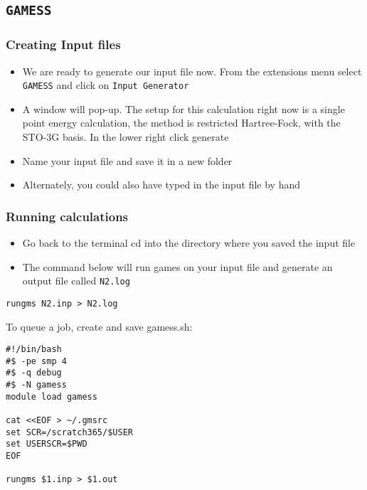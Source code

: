 \documentclass[11pt]{article}
\begin{document}
\subsection{\texttt{GAMESS}}
\label{sec:org825bc2f}

\subsubsection{Creating Input files}
\label{sec:org5f29a80}

\begin{itemize}
\item We are ready to generate our input file now. From the extensions menu select \texttt{GAMESS} and click on \texttt{Input Generator}

\item A window will pop-up. The setup for this calculation right now is a single point energy calculation, the method is restricted Hartree-Fock, with the STO-3G basis. In the lower right click generate

\item Name your input file and save it in a new folder

\item Alternately, you could also have typed in the input file by hand
\end{itemize}

\subsubsection{Running calculations}
\label{sec:org0e8dd48}

\begin{itemize}
\item Go back to the terminal cd into the directory where you saved the input file

\item The command below will run games on your input file and generate an output file called \texttt{N2.log}
\end{itemize}

\begin{verbatim}
rungms N2.inp > N2.log
\end{verbatim}

To queue a job, create and save gamess.sh:
\begin{verbatim}
#!/bin/bash
#$ -pe smp 4
#$ -q debug
#$ -N gamess
module load gamess

cat <<EOF > ~/.gmsrc
set SCR=/scratch365/$USER
set USERSCR=$PWD
EOF

rungms $1.inp > $1.out
\end{verbatim}
\end{document}
